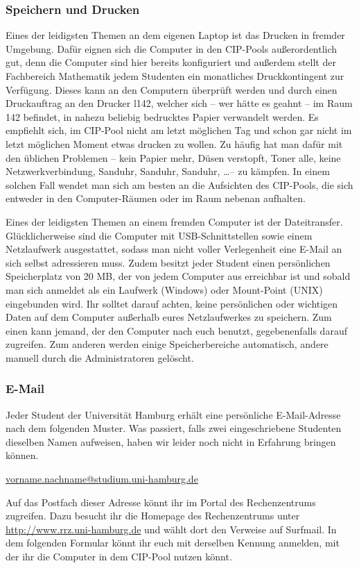 %

\subsubsection{Speichern und Drucken}

Eines der leidigsten Themen an dem eigenen Laptop ist das Drucken in fremder
Umgebung. Dafür eignen sich die Computer in den CIP-Pools außerordentlich gut,
denn die Computer sind hier bereits konfiguriert und außerdem stellt der
Fachbereich Mathematik jedem Studenten ein monatliches Druckkontingent zur
Verfügung. Dieses kann an den Computern überprüft werden und durch einen
Druckauftrag an den Drucker l142, welcher sich -- wer hätte es geahnt -- im
Raum 142 befindet, in nahezu beliebig bedrucktes Papier verwandelt werden. Es
empfiehlt sich, im CIP-Pool nicht am letzt möglichen Tag und schon gar nicht im
letzt möglichen Moment etwas drucken zu wollen. Zu häufig hat man dafür mit den
üblichen Problemen -- kein Papier mehr, Düsen verstopft, Toner alle, keine
Netzwerkverbindung, Sanduhr, Sanduhr, Sanduhr, \dots -- zu kämpfen. In einem
solchen Fall wendet man sich am besten an die Aufsichten des CIP-Pools, die
sich entweder in den Computer-Räumen oder im Raum nebenan aufhalten.

Eines der leidigsten Themen an einem fremden Computer ist der Dateitransfer.
Glücklicherweise sind die Computer mit USB-Schnittstellen sowie einem
Netzlaufwerk ausgestattet, sodass man nicht voller Verlegenheit eine E-Mail an
sich selbst adressieren muss. Zudem besitzt jeder Student einen persönlichen
Speicherplatz von 20 MB, der von jedem Computer aus erreichbar ist und sobald
man sich anmeldet als ein Laufwerk (Windows) oder Mount-Point (UNIX)
eingebunden wird. Ihr solltet darauf achten, keine persönlichen oder wichtigen
Daten auf dem Computer außerhalb eures Netzlaufwerkes zu speichern. Zum einen
kann jemand, der den Computer nach euch benutzt, gegebenenfalls darauf
zugreifen. Zum anderen werden einige Speicherbereiche automatisch, andere
manuell durch die Administratoren gelöscht.

\subsubsection{E-Mail}

Jeder Student der Universität Hamburg erhält eine persönliche E-Mail-Adresse
nach dem folgenden Muster. Was passiert, falls zwei eingeschriebene Studenten
dieselben Namen aufweisen, haben wir leider noch nicht in Erfahrung bringen
können.

\url{vorname.nachname@studium.uni-hamburg.de}

Auf das Postfach dieser Adresse könnt ihr im Portal des Rechenzentrums
zugreifen. Dazu besucht ihr die Homepage des Rechenzentrums unter
\url{http://www.rrz.uni-hamburg.de} und wählt dort den Verweise auf Surfmail.
In dem folgenden Formular könnt ihr euch mit derselben Kennung anmelden, mit
der ihr die Computer in dem CIP-Pool nutzen könnt.
